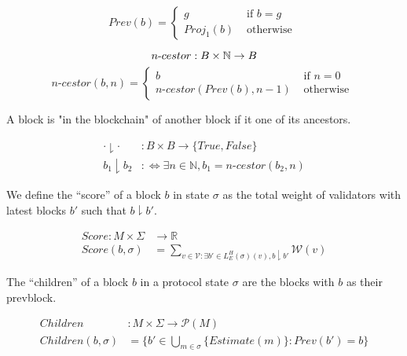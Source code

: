 \[ Prev(b) = \left\{
\begin{array}{ll}
      g& \text{ if $b = g$ } \\
      Proj_1(b)& \text{ otherwise }
\end{array}
\right. \]


\begin{defn}
$$
n\text{-}cestor : B \times \mathbb{N} \to B\\
$$
\[ n\text{-}cestor(b, n) = \left\{
\begin{array}{ll}
      b& \text{ if $n = 0$ } \\
      n\text{-}cestor(Prev(b), n - 1)& \text{ otherwise }
\end{array}
\right. \]
\end{defn}


A block is "in the blockchain" of another block if it one of its ancestors.

\begin{defn}
\begin{align*}
\cdot \downharpoonright \cdot&: B \times B \to \{True, False\} \\
b_1 \downharpoonright b_2 &:\Leftrightarrow \exists n \in \mathbb{N}, b_1 = n\text{-}cestor(b_2, n)
\end{align*}
\end{defn}

We define the ``score'' of a block $b$ in state $\sigma$ as the total weight of validators with latest blocks $b'$ such that $b \downharpoonright b'$.

\begin{defn}
\begin{align*}
Score: M \times \Sigma &\to \mathbb{R} \\
Score(b, \sigma) &= \sum_{v \in \mathcal{V} : \exists b' \in L^H_E(\sigma)(v), b \downharpoonright b'} \mathcal{W}(v)
\end{align*}
\end{defn}


The ``children'' of a block $b$ in a protocol state $\sigma$ are the blocks with $b$ as their prevblock.

\begin{defn}
\begin{align*}
Children&: M \times \Sigma \to \mathcal{P}(M)\\
Children(b,\sigma) &= \{b' \in \bigcup_{m \in \sigma} \{Estimate(m)\} : Prev(b') = b\}
\end{align*}
\end{defn}

